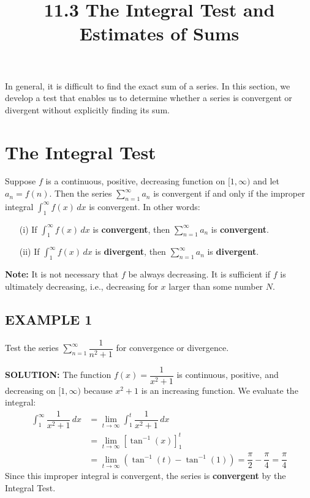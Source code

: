 \documentclass{article}
\title{11.3 The Integral Test and Estimates of Sums}
\date{}
\author{}
\begin{document}
\maketitle

In general, it is difficult to find the exact sum of a series. In this section, we develop a test that enables us to determine whether a series is convergent or divergent without explicitly finding its sum.

\section*{The Integral Test}

\begin{tcolorbox}[
    colback=white,
    colframe=orange!80!white,
    title=The Integral Test,
    boxrule=0.5mm,
    arc=3mm
    ]
    Suppose \(f\) is a continuous, positive, decreasing function on \([1, \infty)\) and let \(a_n = f(n)\). Then the series \( \sum_{n=1}^{\infty} a_n \) is convergent if and only if the improper integral \( \int_1^\infty f(x) \,dx \) is convergent. In other words:
    \begin{itemize}
        \item[(i)] If \( \int_1^\infty f(x) \,dx \) is \textbf{convergent}, then \( \sum_{n=1}^{\infty} a_n \) is \textbf{convergent}.
        \item[(ii)] If \( \int_1^\infty f(x) \,dx \) is \textbf{divergent}, then \( \sum_{n=1}^{\infty} a_n \) is \textbf{divergent}.
    \end{itemize}
    \textbf{Note:} It is not necessary that \(f\) be always decreasing. It is sufficient if \(f\) is ultimately decreasing, i.e., decreasing for \(x\) larger than some number \(N\).
\end{tcolorbox}

\subsection*{EXAMPLE 1}
Test the series \( \sum_{n=1}^{\infty} \dfrac{1}{n^2+1} \) for convergence or divergence.

\textbf{SOLUTION:}
The function \(f(x) = \dfrac{1}{x^2+1}\) is continuous, positive, and decreasing on \([1, \infty)\) because \(x^2+1\) is an increasing function. We evaluate the integral:
\begin{align*}
    \int_1^\infty \dfrac{1}{x^2+1} \,dx &= \lim_{t\to\infty} \int_1^t \dfrac{1}{x^2+1} \,dx \\
    &= \lim_{t\to\infty} \left[ \tan^{-1}(x) \right]_1^t \\
    &= \lim_{t\to\infty} (\tan^{-1}(t) - \tan^{-1}(1)) = \dfrac{\pi}{2} - \dfrac{\pi}{4} = \dfrac{\pi}{4}
\end{align*}
Since this improper integral is convergent, the series is \textbf{convergent} by the Integral Test.
\end{document}
